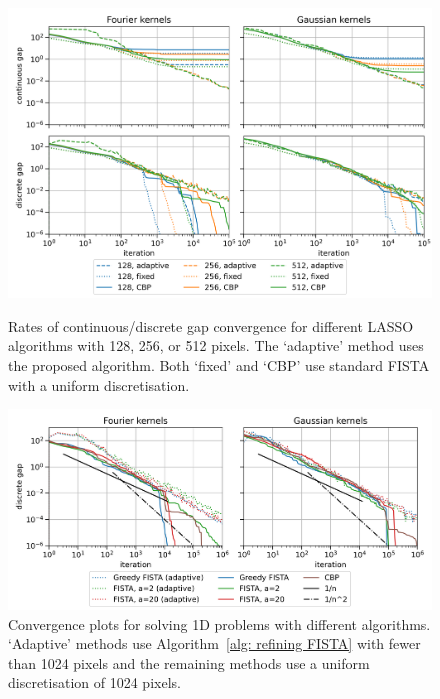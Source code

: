 \documentclass[smallextended]{svjour3}
\newcommand{\1}{\F{1}}
\begin{document}
	\begin{figure}\centering
		\includegraphics[width=.9\textwidth]{lasso_ndofs_convergence}
		\caption{Rates of continuous/discrete gap convergence for different LASSO algorithms with 128, 256, or 512 pixels. The `adaptive' method uses the proposed algorithm. Both `fixed' and `CBP' use standard FISTA with a uniform discretisation.}\label{fig: convergence with ndofs}
		
		\vspace*{\floatsep}
		
		\includegraphics[width=.9\textwidth]{lasso_convergence_short}
		\caption{Convergence plots for solving 1D problems with different algorithms. `Adaptive' methods use Algorithm~\ref{alg: refining FISTA} with fewer than 1024 pixels and the remaining methods use a uniform discretisation of 1024 pixels.}\label{fig: convergence with method}
		
		\vspace*{\floatsep}


\end{figure}
\end{document}
